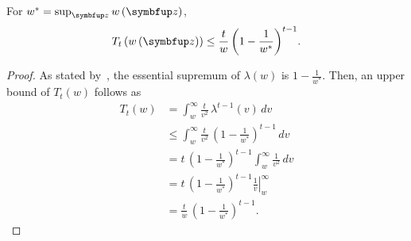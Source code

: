 
\begin{lemma}\label{thm:tn_bound}
  For \(w^* = \sup_{\vz} w\left(\vz\right) \), 
  \[
  T_t\left( w\left(\vz\right) \right) \leq \frac{t}{w} \, {\left(1 - \frac{1}{w^*}\right)}^{t-1}.
  \]
\end{lemma}
\begin{proof}
  As stated by~\citet{Smith96exacttransition}, the essential supremum of \(\lambda\left(w\right)\) is \(1 - \frac{1}{w^*}\).
  Then, an upper bound of \(T_t\left(w\right)\) follows as
  \begin{align}
    T_t\left(w\right) 
    &= \int_w^{\infty} \frac{t}{v^2} \, \lambda^{t-1}\left(v\right)\,dv \\
    &\leq \int_w^{\infty} \frac{t}{v^2} \, {\left(1 - \frac{1}{w^*}\right)}^{t-1}\,dv \\
    &= t \, {\left(1 - \frac{1}{w^*}\right)}^{t-1}  \int_w^{\infty} \frac{1}{v^2} \,dv \\
    &= t \, {\left(1 - \frac{1}{w^*}\right)}^{t-1}  {\left.\frac{1}{v}\right\rvert^{\infty}_{w}} \\
    &= \frac{t}{w} \, {\left(1 - \frac{1}{w^*}\right)}^{t-1}.
  \end{align}
\end{proof}


